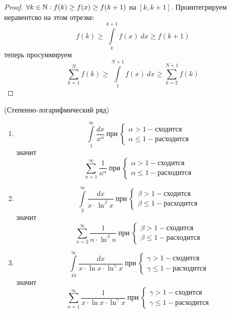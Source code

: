 \begin{proof}
    $\forall k\in \mathbb{N}: f(k)\geq f(x)\geq f(k+1)$ на $[k, k+1]$. Проинтегрируем неравентсво на этом отрезке:
    \[f(k)\geq \int\limits_{k}^{k+1}f(x)\ dx\geq f(k+1)\]
    теперь просуммируем
    \[\sum_{k=1}^{N}f(k)\geq \int\limits_{1}^{N+1}f(x)\ dx\geq \sum_{k=2}^{N+1}f(k)\]
\end{proof}
\newpage
\begin{example}(Степенно-логарифмический ряд)\\
    \begin{enumerate}
        \item 
    \[\int\limits_{1}^{\infty}\frac{dx}{x^{\alpha}}\ \text{при}\ \begin{cases}
        \alpha>1 - \text{сходится}\\
        \alpha\leq 1 - \text{расходится}
    \end{cases}\]
    значит
    \[\sum_{n=1}^{\infty}\frac{1}{n^{\alpha}}\ \text{при}\ \begin{cases}
        \alpha>1 - \text{сходится}\\
        \alpha\leq 1 - \text{расходится}
    \end{cases}\]
    \item
    \[\int\limits_{2}^{\infty}\frac{dx}{x\cdot \ln^{\beta}{x}}\ \text{при}\ \begin{cases}
        \beta>1 - \text{сходится}\\
        \beta\leq 1 - \text{расходится}
    \end{cases}\]
    значит
    \[\sum_{n=2}^{\infty}\frac{1}{n\cdot \ln^{\beta}{n}}\ \text{при}\ \begin{cases}
        \beta>1 - \text{сходится}\\
        \beta\leq 1 - \text{расходится}
    \end{cases}\]
    \item
    \[\int\limits_{10}^{\infty}\frac{dx}{x\cdot \ln{x}\cdot \ln^{\gamma}{x}}\ \text{при}\ \begin{cases}
        \gamma>1 - \text{сходится}\\
        \gamma\leq 1 - \text{расходится}
    \end{cases}\]
    значит
    \[\sum_{n=1}^{\infty}\frac{1}{x\cdot \ln{x}\cdot \ln^{\gamma}{x}}\ \text{при}\ \begin{cases}
        \gamma>1 - \text{сходится}\\
        \gamma\leq 1 - \text{расходится}
    \end{cases}\]
    \end{enumerate}
\end{example}
